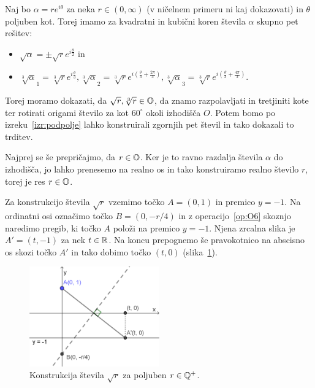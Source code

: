 \begin{dokaz}
    Naj bo $\alpha = r e^{i \theta}$ za neka $r \in (0, \infty)$ (v ničelnem primeru ni kaj dokazovati) in $\theta$ poljuben kot. Torej imamo za kvadratni in kubični koren števila $\alpha$ skupno pet rešitev:
    \begin{itemize}
        \item $\sqrt{\alpha} = \pm \sqrt{r}e^{i \frac{\theta}{2}}$ in
        \item $\sqrt[3]{\alpha}_1 = \sqrt[3]{r}e^{i \frac{\theta}{3}}, \sqrt[3]{\alpha}_2 = \sqrt[3]{r}e^{i \left(\frac{\theta}{3} + \frac{2\pi}{3}\right)}, \sqrt[3]{\alpha}_3 = \sqrt[3]{r}e^{i \left(\frac{\theta}{3} + \frac{4\pi}{3}\right)}$.
    \end{itemize}
    Torej moramo dokazati, da $\sqrt{r}, \sqrt[3]{r} \in \mathbb O$, da znamo razpolavljati in tretjiniti kote ter rotirati origami število za kot $60^\circ$ okoli izhodišča $O$. Potem bomo po izreku~\ref{izr:podpolje} lahko konstruirali zgornjih pet števil in tako dokazali to trditev.

    Najprej se še prepričajmo, da $r \in \mathbb O$. Ker je to ravno razdalja števila $\alpha$ do izhodišča, jo lahko prenesemo na realno os in tako konstruiramo realno število $r$, torej je res $r \in \mathbb O$.

    Za konstrukcijo števila $\sqrt{r}$ vzemimo točko $A = (0, 1) $ in premico $y = -1$. Na ordinatni osi označimo točko $B = (0, -r/4)$ in z operacijo~\ref{op:O6} skoznjo naredimo pregib, ki točko $A$ položi na premico $y = -1$. Njena zrcalna slika je $A'=(t, -1) $ za nek $t \in \mathbb R$. Na koncu prepognemo še pravokotnico na abscisno os skozi točko $A'$ in tako dobimo točko $(t, 0)$ (slika~\ref{fig:konstrukcija_korena}).
    \begin{figure}[h]
        \centering
        \includegraphics[width=0.5\textwidth]{images/kvadratni_koren.png}
        \caption[Konstrukcija korena]{Konstrukcija števila $\sqrt{r}$ za poljuben $r \in \mathbb Q^{+}$.}
        \label{fig:konstrukcija_korena}
    \end{figure}


\end{dokaz}
